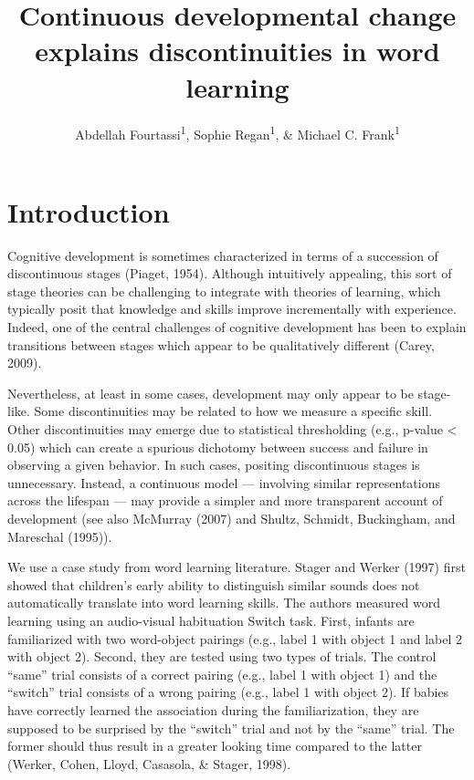 \documentclass[english,,man,floatsintext]{apa6}
\title{Continuous developmental change explains discontinuities in word
learning}
\author{Abdellah Fourtassi\textsuperscript{1}, Sophie Regan\textsuperscript{1},
\& Michael C. Frank\textsuperscript{1}}
\date{}
\affiliation{
\vspace{0.5cm}
\textsuperscript{1} Department of Psychology, Stanford University}
\theoremstyle{definition}
\theoremstyle{definition}
\theoremstyle{definition}
\theoremstyle{remark}
\begin{document}
\maketitle

\section{Introduction}\label{introduction}

Cognitive development is sometimes characterized in terms of a
succession of discontinuous stages (Piaget, 1954). Although intuitively
appealing, this sort of stage theories can be challenging to integrate
with theories of learning, which typically posit that knowledge and
skills improve incrementally with experience. Indeed, one of the central
challenges of cognitive development has been to explain transitions
between stages which appear to be qualitatively different (Carey, 2009).

Nevertheless, at least in some cases, development may only appear to be
stage-like. Some discontinuities may be related to how we measure a
specific skill. Other discontinuities may emerge due to statistical
thresholding (e.g., p-value \textless{} 0.05) which can create a
spurious dichotomy between success and failure in observing a given
behavior. In such cases, positing discontinuous stages is unnecessary.
Instead, a continuous model --- involving similar representations across
the lifespan --- may provide a simpler and more transparent account of
development (see also McMurray (2007) and Shultz, Schmidt, Buckingham,
and Mareschal (1995)).

We use a case study from word learning literature. Stager and Werker
(1997) first showed that children's early ability to distinguish similar
sounds does not automatically translate into word learning skills. The
authors measured word learning using an audio-visual habituation Switch
task. First, infants are familiarized with two word-object pairings
(e.g., label 1 with object 1 and label 2 with object 2). Second, they
are tested using two types of trials. The control \enquote{same} trial
consists of a correct pairing (e.g., label 1 with object 1) and the
\enquote{switch} trial consists of a wrong pairing (e.g., label 1 with
object 2). If babies have correctly learned the association during the
familiarization, they are supposed to be surprised by the
\enquote{switch} trial and not by the \enquote{same} trial. The former
should thus result in a greater looking time compared to the latter
(Werker, Cohen, Lloyd, Casasola, \& Stager, 1998).
\end{document}
